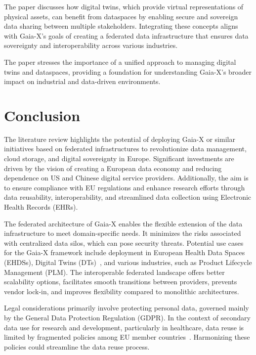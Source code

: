 The paper discusses how digital twins, which provide virtual representations of physical assets, can benefit from dataspaces by enabling secure and sovereign data sharing between multiple stakeholders.
Integrating these concepts aligns with Gaia-X's goals of creating a federated data infrastructure that ensures data sovereignty and interoperability across various industries.

The paper stresses the importance of a unified approach to managing digital twins and dataspaces, providing a foundation for understanding Gaia-X's broader impact on industrial and data-driven environments.

\section{Conclusion}\label{sec:conclusion}

The literature review highlights the potential of deploying Gaia-X or similar initiatives based on federated infrastructures to revolutionize data management, cloud storage, and digital sovereignty in Europe.
Significant investments are driven by the vision of creating a European data economy and reducing dependence on US and Chinese digital service providers.
Additionally, the aim is to ensure compliance with EU regulations and enhance research efforts through data reusability, interoperability, and streamlined data collection using Electronic Health Records (EHRs).

The federated architecture of Gaia-X enables the flexible extension of the data infrastructure to meet domain-specific needs.
It minimizes the risks associated with centralized data silos, which can pose security threats.
Potential use cases for the Gaia-X framework include deployment in European Health Data Spaces (EHDSs), Digital Twins (DTs)~\cite{sec:digital-twins-and-data-spaces, subsec:on-the-role-of-digital-twins-in-data-spaces}, and various industries, such as Product Lifecycle Management (PLM).
The interoperable federated landscape offers better scalability options, facilitates smooth transitions between providers, prevents vendor lock-in, and improves flexibility compared to monolithic architectures.

Legal considerations primarily involve protecting personal data, governed mainly by the General Data Protection Regulation (GDPR).
In the context of secondary data use for research and development, particularly in healthcare, data reuse is limited by fragmented policies among EU member countries~\cite{legal_and_technological_aspects_of_ehds}.
Harmonizing these policies could streamline the data reuse process.

